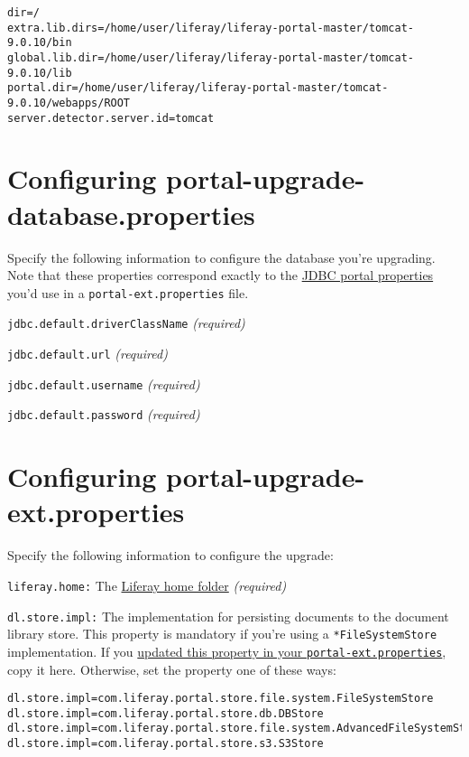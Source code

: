 \begin{verbatim}
dir=/
extra.lib.dirs=/home/user/liferay/liferay-portal-master/tomcat-9.0.10/bin
global.lib.dir=/home/user/liferay/liferay-portal-master/tomcat-9.0.10/lib
portal.dir=/home/user/liferay/liferay-portal-master/tomcat-9.0.10/webapps/ROOT
server.detector.server.id=tomcat
\end{verbatim}

\section{Configuring
portal-upgrade-database.properties}\label{configuring-portal-upgrade-database.properties}

Specify the following information to configure the database you're
upgrading. Note that these properties correspond exactly to the
\href{https://docs.liferay.com/dxp/portal/7.2-latest/propertiesdoc/portal.properties.html\#JDBC}{JDBC
portal properties} you'd use in a \texttt{portal-ext.properties} file.

\texttt{jdbc.default.driverClassName} \emph{(required)}

\texttt{jdbc.default.url} \emph{(required)}

\texttt{jdbc.default.username} \emph{(required)}

\texttt{jdbc.default.password} \emph{(required)}

\section{Configuring
portal-upgrade-ext.properties}\label{configuring-portal-upgrade-ext.properties}

Specify the following information to configure the upgrade:

\texttt{liferay.home:} The
\href{/docs/7-2/deploy/-/knowledge_base/d/liferay-home}{Liferay home
folder} \emph{(required)}

\texttt{dl.store.impl:} The implementation for persisting documents to
the document library store. This property is mandatory if you're using a
\texttt{*FileSystemStore} implementation. If you
\href{/docs/7-2/deploy/-/knowledge_base/d/preparing-a-new-product-server-for-data-upgrade}{updated
this property in your \texttt{portal-ext.properties}}, copy it here.
Otherwise, set the property one of these ways:

\begin{verbatim}
dl.store.impl=com.liferay.portal.store.file.system.FileSystemStore
dl.store.impl=com.liferay.portal.store.db.DBStore
dl.store.impl=com.liferay.portal.store.file.system.AdvancedFileSystemStore
dl.store.impl=com.liferay.portal.store.s3.S3Store
\end{verbatim}

